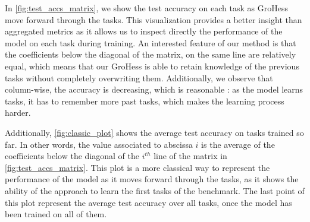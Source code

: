 \documentclass[11pt]{article}
\begin{document}
In \ref{fig:test_accs_matrix}, we show the test accuracy on each task as GroHess move forward through the tasks. This visualization provides a better insight than aggregated metrics as it allows us to inspect directly the performance of the model on each task during training. An interested feature of our method is that the coefficients below the diagonal of the matrix, on the same line are relatively equal, which means that our GroHess is able to retain knowledge of the previous tasks without completely overwriting them. Additionally, we observe that column-wise, the accuracy is decreasing, which is reasonable : as the model learns tasks, it has to remember more past tasks, which makes the learning process harder.

\vspace{2mm}
\noindent
Additionally, \ref{fig:classic_plot} shows the average test accuracy on tasks trained so far. In other words, the value associated to abscissa $i$ is the average of the coefficients below the diagonal of the $i^{th}$ line of the matrix in \ref{fig:test_accs_matrix}. This plot is a more classical way to represent the performance of the model as it moves forward through the tasks, as it shows the ability of the approach to learn the first tasks of the benchmark. The last point of this plot represent the average test accuracy over all tasks, once the model has been trained on all of them.
\end{document}

